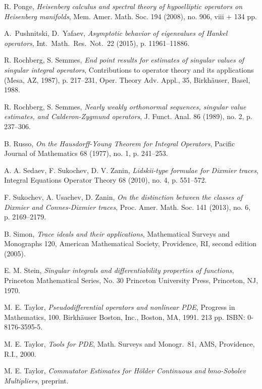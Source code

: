 \documentclass[10pt]{amsart}
\theoremstyle{remark}
\theoremstyle{definition}
\begin{document}
\begin{thebibliography}{100}
 R. Ponge, \emph{Heisenberg calculus and spectral theory of hypoelliptic operators on Heisenberg manifolds}, Mem. Amer. Math. Soc. 194 (2008), no. 906, viii + 134 pp.

 A.~Pushnitski, D.~Yafaev, \emph{Asymptotic behavior of eigenvalues of Hankel operators}, Int.~Math.~Res.~Not.~22 (2015), p. 11961--11886.

 R. Rochberg, S. Semmes, \emph{End point results for estimates of singular values of singular integral operators}, Contributions to operator theory and its applications (Mesa, AZ, 1987), p. 217--231, Oper. Theory Adv. Appl., 35, Birkh\"auser, Basel, 1988. 

 R. Rochberg, S. Semmes, \emph{Nearly weakly orthonormal sequences, singular value estimates, and Calderon-Zygmund operators}, J. Funct. Anal. 86 (1989), no. 2, p. 237--306.

 B. Russo, \emph{On the Hausdorff-Young Theorem for Integral Operators}, Pacific Journal of Mathematics 68 (1977), no. 1,  p. 241--253.

 A. A. Sedaev, F. Sukochev, D. V. Zanin, \emph{Lidskii-type formulae for Dixmier traces}, Integral Equations Operator Theory 68 (2010), no. 4, p. 551--572.

 F. Sukochev, A. Usachev, D. Zanin, \emph{On the distinction between the classes of Dixmier and Connes-Dixmier traces}, Proc. Amer. Math. Soc. 141 (2013), no. 6, p. 2169--2179.

 B. Simon, \emph{Trace ideals and their applications}, Mathematical Surveys and Monographs 120, American Mathematical Society, Providence, RI, second edition (2005).

 E. M. Stein, \emph{Singular integrals and differentiability properties of functions}, Princeton Mathematical Series, No. 30 Princeton University Press, Princeton, NJ, 1970.

 M. E. Taylor, \emph{Pseudodifferential operators and nonlinear PDE}, Progress in Mathematics, 100. Birkh\"auser Boston, Inc., Boston, MA, 1991. 213 pp. ISBN: 0-8176-3595-5.

 M. E. Taylor, \emph{Tools for PDE}, Math. Surveys and Monogr.~81, AMS, Providence, R.I., 2000.

 M. E. Taylor, \emph{Commutator Estimates for H\"older Continuous and $bmo$-Sobolev Multipliers}, preprint.


\end{thebibliography}
\end{document}
